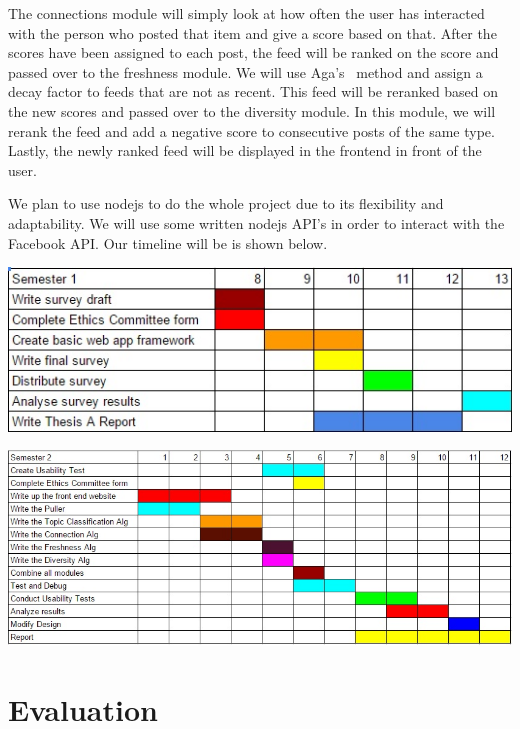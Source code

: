 The connections module will simply look at how often the user has interacted with the person who posted that item and give a score based on that. After the scores have been assigned to each post,  the feed will be ranked on the score and passed over to the freshness module. We will use Aga's~\cite{Aga2014} method and assign a decay factor to feeds that are not as recent. This feed will be reranked based on the new scores and passed over to the diversity module. In this module, we will rerank the feed and add a negative score to consecutive posts of the same type. Lastly, the newly ranked feed will be displayed in the frontend in front of the user.

We plan to use nodejs to do the whole project due to its flexibility and adaptability. We will use some written nodejs API's in order to interact with the Facebook API. 
Our timeline will be is shown below.

\begin{center}
  \includegraphics{images/sem1thesis.jpg}
\end{center}

\begin{center}
  \includegraphics[scale=0.8]{images/sem2thesis.jpg}
\end{center}

\section {Evaluation}

